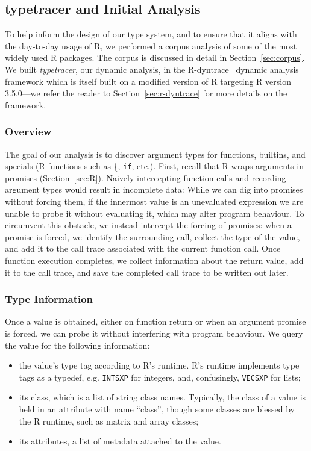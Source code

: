 \documentclass[acmsmall,review,anonymous]{acmart}\settopmatter{printfolios=true,printccs=false,printacmref=false}
\newcommand{\code}[1]{{\lstinline[style=Rin]!#1!}\xspace}
\newcommand{\typetracer}{\emph{typetracer}\xspace} %
\begin{document}
%
%
\subsection{typetracer and Initial Analysis}

To help inform the design of our type system, and to ensure that it aligns
with the day-to-day usage of R, we performed a corpus analysis of some of
the most widely used R packages.  The corpus is discussed in detail in
Section~\ref{sec:corpus}.  We built \typetracer, our dynamic analysis, in
the R-dyntrace~\cite{oopsla19} dynamic analysis framework which is itself
built on a modified version of R targeting R version 3.5.0---we refer the
reader to Section~\ref{sec:r-dyntrace} for more details on the framework.

%
%
\subsubsection{Overview}
The goal of our analysis is to discover argument types for functions,
builtins, and specials (R functions such as \{, \code{if}, etc.).  First,
recall that R wraps arguments in promises (Section~\ref{sec:R}).  Naively
intercepting function calls and recording argument types would result in
incomplete data: While we can dig into promises without forcing them, if the
innermost value is an unevaluated expression we are unable to probe it
without evaluating it, which may alter program behaviour.  To circumvent
this obstacle, we instead intercept the forcing of promises: when a promise
is forced, we identify the surrounding call, collect the type of the value,
and add it to the call trace associated with the current function call.
Once function execution completes, we collect information about the return
value, add it to the call trace, and save the completed call trace to be
written out later.
%
%
\subsubsection{Type Information}
Once a value is obtained, either on function return or when an argument
promise is forced, we can probe it without interfering with program behaviour.
We query the value for the following information:

\begin{itemize}
\item the value's type tag according to R's runtime. R's runtime implements
  type tags as a typedef, e.g. \code{INTSXP} for integers, and, confusingly,
  \code{VECSXP} for lists;
\item its class, which is a list of string class names. Typically, the class
  of a value is held in an attribute with name ``class'', though some
  classes are blessed by the R runtime, such as matrix and array classes;
\item its attributes, a list of metadata attached to the value.
\end{itemize}
\end{document}
